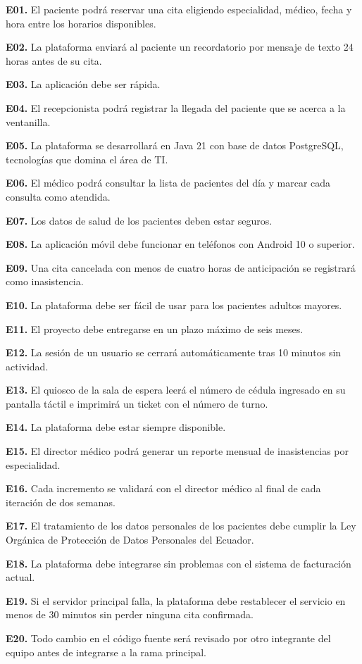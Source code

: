 \textbf{E01.} El paciente podrá reservar una cita eligiendo especialidad, médico, fecha y hora entre los horarios disponibles.\par
\textbf{E02.} La plataforma enviará al paciente un recordatorio por mensaje de texto 24 horas antes de su cita.\par
\textbf{E03.} La aplicación debe ser rápida.\par
\textbf{E04.} El recepcionista podrá registrar la llegada del paciente que se acerca a la ventanilla.\par
\textbf{E05.} La plataforma se desarrollará en Java 21 con base de datos PostgreSQL, tecnologías que domina el área de TI.\par
\textbf{E06.} El médico podrá consultar la lista de pacientes del día y marcar cada consulta como atendida.\par
\textbf{E07.} Los datos de salud de los pacientes deben estar seguros.\par
\textbf{E08.} La aplicación móvil debe funcionar en teléfonos con Android 10 o superior.\par
\textbf{E09.} Una cita cancelada con menos de cuatro horas de anticipación se registrará como inasistencia.\par
\textbf{E10.} La plataforma debe ser fácil de usar para los pacientes adultos mayores.\par
\textbf{E11.} El proyecto debe entregarse en un plazo máximo de seis meses.\par
\textbf{E12.} La sesión de un usuario se cerrará automáticamente tras 10 minutos sin actividad.\par
\textbf{E13.} El quiosco de la sala de espera leerá el número de cédula ingresado en su pantalla táctil e imprimirá un ticket con el número de turno.\par
\textbf{E14.} La plataforma debe estar siempre disponible.\par
\textbf{E15.} El director médico podrá generar un reporte mensual de inasistencias por especialidad.\par
\textbf{E16.} Cada incremento se validará con el director médico al final de cada iteración de dos semanas.\par
\textbf{E17.} El tratamiento de los datos personales de los pacientes debe cumplir la Ley Orgánica de Protección de Datos Personales del Ecuador.\par
\textbf{E18.} La plataforma debe integrarse sin problemas con el sistema de facturación actual.\par
\textbf{E19.} Si el servidor principal falla, la plataforma debe restablecer el servicio en menos de 30 minutos sin perder ninguna cita confirmada.\par
\textbf{E20.} Todo cambio en el código fuente será revisado por otro integrante del equipo antes de integrarse a la rama principal.\par
